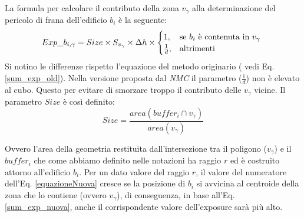 La formula per calcolare il contributo della zona $v_\gamma$ alla determinazione del pericolo di frana dell'edificio $b_i$ è la seguente:
\begin{equation}
\label{equazioneNuova}
Exp$\_$b_{i,\gamma} = Size \times S_{v_\gamma} \times \Delta{h} \times \begin{cases}
               1,  & \text{se $b_i$ è contenuta in $v_\gamma$ }\\
               \frac{1}{d}, & \text{altrimenti}
            \end{cases} 
\end{equation}
Si notino le differenze rispetto l'equazione del metodo originario ( vedi Eq.\ref{sum_exp_old}). \newline
Nella versione proposta dal \textit{NMC} il parametro ($\frac{1}{d}$) non è elevato al cubo. Questo per evitare di smorzare troppo il contributo delle $v_\gamma$ vicine. Il parametro $Size$ è così definito:
\begin{equation}
\label{size}
 Size= \frac{area (buffer_i \cap v_\gamma)}{area(v_\gamma)} 
\end{equation}

Ovvero l’area della geometria restituita dall’intersezione tra il poligono ($v_\gamma$) e il $buffer_i$ che come abbiamo definito nelle notazioni ha raggio $r$ ed è costruito attorno all'edificio $b_i$. Per un dato valore del raggio $r$, il valore del numeratore dell’Eq. \ref{equazioneNuova} cresce se la posizione di $b_i$ si avvicina al centroide della zona che lo contiene (ovvero $v_\gamma$), di conseguenza, in base all’Eq.\ref{sum_exp_nuova}, anche il corrispondente valore
dell’exposure sarà più alto.

